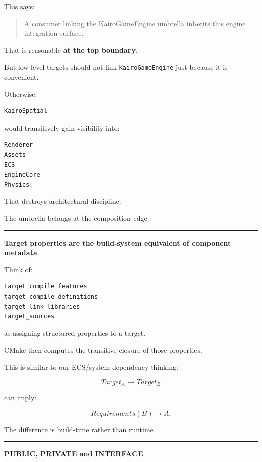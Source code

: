 This says:

\begin{quote}
A consumer linking the KairoGameEngine umbrella inherits this engine integration surface.
\end{quote}

That is reasonable \textbf{at the top boundary}.

But low-level targets should not link \texttt{KairoGameEngine} just because it is convenient.

Otherwise:

\begin{verbatim}
KairoSpatial
\end{verbatim}

would transitively gain visibility into:

\begin{verbatim}
Renderer
Assets
ECS
EngineCore
Physics.
\end{verbatim}

That destroys architectural discipline.

The umbrella belongs at the composition edge.

\begin{center}\rule{0.5\linewidth}{0.5pt}\end{center}

\textbf{Target properties are the build-system equivalent of component metadata}

Think of:

\begin{verbatim}
target_compile_features
target_compile_definitions
target_link_libraries
target_sources
\end{verbatim}

as assigning structured properties to a target.

CMake then computes the transitive closure of those properties.

This is similar to our ECS/system dependency thinking:

\[
Target_A
\rightarrow
Target_B
\]

can imply:

\[
Requirements(B)
\rightarrow
A.
\]

The difference is build-time rather than runtime.

\begin{center}\rule{0.5\linewidth}{0.5pt}\end{center}

\textbf{PUBLIC, PRIVATE and INTERFACE}

